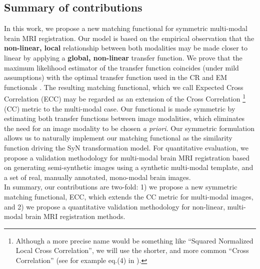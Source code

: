 \subsection{Summary of contributions}
In this work, we propose a new matching functional for symmetric multi-modal brain MRI registration. Our model is based on the empirical observation that the \textbf{non-linear, local} relationship between both modalities may be made closer to linear by applying a \textbf{global, non-linear} transfer function. We prove that the maximum likelihood estimator of the transfer function coincides (under mild assumptions) with the optimal transfer function used in the CR and EM functionals \citep{Roche1998} \cite{Arce-santana2014}. The resulting matching functional, which we call Expected Cross Correlation (ECC) may be regarded as an extension of the Cross Correlation \footnote{Although a more precise name would be something like ``Squared Normalized Local Cross Correlation'', we will use the shorter, and more common ``Cross Correlation'' (see for example eq.(4) in \cite{Avants2008}).} (CC) metric to the multi-modal case. Our functional is made symmetric by estimating both transfer functions between image modalities, which eliminates the need for an image modality to be chosen {\it a priori}. Our symmetric formulation allows us to naturally implement our matching functional as the similarity function driving the SyN \citep{Avants2011a} transformation model. For quantitative evaluation, we propose a validation methodology for multi-modal brain MRI registration based on generating semi-synthetic images using a synthetic multi-modal template, and a set of real, manually annotated, mono-modal brain images.\\

In summary, our contributions are two-fold: 1) we propose a new symmetric matching functional, ECC, which extends the CC metric for multi-modal images, and 2) we propose a quantitative validation methodology for non-linear, multi-modal brain MRI registration methods.
